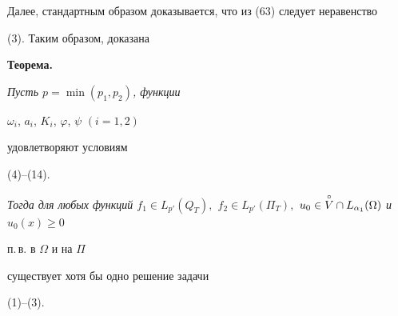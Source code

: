 Далее, стандартным образом доказывается, что из (63) следует неравенство 


(3). Таким образом, доказана 





{\bf Теорема.} {\it Пусть $p=\min(p_1,p_2)$, функции


$\omega_i$, $a_i$, $K_i$, $\varphi$, $\psi$ $(i=1,2)$ 


удовлетворяют условиям} (4)--(14). {\it Тогда для любых функций $f_1\in 


L_{p'}(Q_T),$ $f_2\in L_{p'}(\Pi_T),$ $u_0\in 


\oc V\cap L_{\alpha_1}(\Omega)$ и $u_0(x)\ge 0$ 


п.\,в. в $\Omega$ и на $\Pi$ 


существует хотя бы одно решение задачи} (1)--(3). 


\bigskip 


